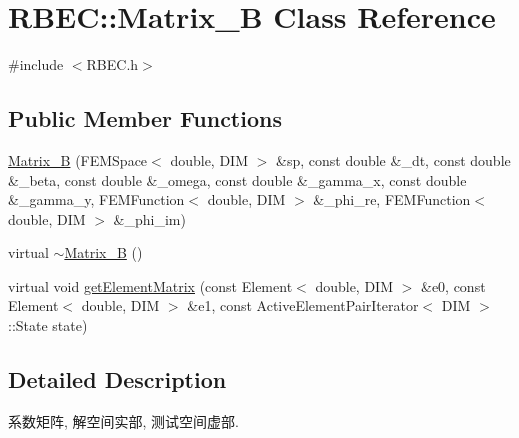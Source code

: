 \hypertarget{classRBEC_1_1Matrix__B}{\section{\-R\-B\-E\-C\-:\-:\-Matrix\-\_\-\-B \-Class \-Reference}
\label{classRBEC_1_1Matrix__B}
}


{\ttfamily \#include $<$\-R\-B\-E\-C.\-h$>$}

\subsection*{\-Public \-Member \-Functions}
\begin{DoxyCompactItemize}
\item 
\hyperlink{classRBEC_1_1Matrix__B_af4dda8e5f39022e148dbca91525d7c88}{\-Matrix\-\_\-\-B} (\-F\-E\-M\-Space$<$ double, \-D\-I\-M $>$ \&sp, const double \&\-\_\-dt, const double \&\-\_\-beta, const double \&\-\_\-omega, const double \&\-\_\-gamma\-\_\-x, const double \&\-\_\-gamma\-\_\-y, \-F\-E\-M\-Function$<$ double, \-D\-I\-M $>$ \&\-\_\-phi\-\_\-re, \-F\-E\-M\-Function$<$ double, \-D\-I\-M $>$ \&\-\_\-phi\-\_\-im)
\item 
virtual \hyperlink{classRBEC_1_1Matrix__B_a28310d76a2c833ed8d596507e2419d26}{$\sim$\-Matrix\-\_\-\-B} ()
\item 
virtual void \hyperlink{classRBEC_1_1Matrix__B_a3cccb901663eac02eb2c734b5f176767}{get\-Element\-Matrix} (const \-Element$<$ double, \-D\-I\-M $>$ \&e0, const \-Element$<$ double, \-D\-I\-M $>$ \&e1, const \-Active\-Element\-Pair\-Iterator$<$ \-D\-I\-M $>$\-::\-State state)
\end{DoxyCompactItemize}


\subsection{\-Detailed \-Description}
系数矩阵, 解空间实部, 测试空间虚部. 

